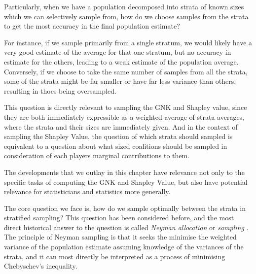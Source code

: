 Particularly, when we have a population decomposed into strata of known sizes which we can selectively sample from, how do we choose samples from the strata to get the most accuracy in the final population estimate?


For instance, if we sample primarily from a single stratum, we would likely have a very good estimate of the average for that one stratum, but no accuracy in estimate for the others, leading to a weak estimate of the population average.
Conversely, if we choose to take the same number of samples from all the strata, some of the strata might be far smaller or have far less variance than others, resulting in thoes being oversampled.

This question is directly relevant to sampling the GNK and Shapley value, since they are both immediately expressible as a weighted average of strata averages, where the strata and their sizes are immediately given. And in the context of sampling the Shapley Value, the question of which strata should sampled is equivalent to a question about what sized coalitions should be sampled in consideration of each players marginal contributions to them.

The developments that we outlay in this chapter have relevance not only to the specific tasks of computing the GNK and Shapley Value, but also have potential relevance for statisticians and statistics more generally.

The core question we face is, how do we sample optimally between the strata in stratified sampling?
This question has been considered before, and the most direct historical answer to the question is called \textit{Neyman allocation} or \textit{sampling} \cite{1938.10503378,10.2307/23339498}.
The principle of Neyman sampling is that it seeks the minimise the weighted variance of the population estimate assuming knowledge of the variances of the strata, and it can most directly be interpreted as a process of minimising Chebyschev's inequality.

